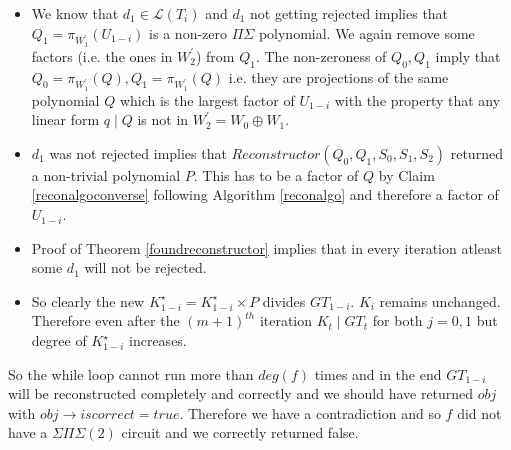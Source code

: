 \documentclass[letterpaper,USenglish,numberwithinsect]{lipics}
\newcommand{\ML}{\mathcal{L}}
\begin{document}
\begin{enumerate}
\begin{itemize}
  \item We know that $d_1\in \ML(T_i)$ and $d_1$ not getting rejected implies that $Q_1 =\pi_{W_1^\prime}(U_{1-i}) $ is a non-zero
  $\Pi\Sigma$ polynomial. We again remove some factors (i.e. the ones in $W_2^\prime$) from $Q_1$. The non-zeroness of
  $Q_0,Q_1$ imply that $Q_0= \pi_{W_1^\prime}(Q), Q_1= \pi_{W_1^\prime}(Q)$ i.e. they are projections of the same polynomial $Q$
  which is the largest factor of $U_{1-i}$ with the property that any linear form $q\mid Q$ is not in $W_2^\prime=W_0\oplus W_1$.
  \item $d_1$ was not rejected implies that $Reconstructor(Q_0,Q_1,S_0,S_1,S_2)$ returned a non-trivial polynomial $P$.
  This has to be a factor of $Q$ by Claim \ref{reconalgoconverse} following Algorithm \ref{reconalgo} and therefore a factor of $U_{1-i}$.
  \item Proof of Theorem \ref{foundreconstructor} implies that in every iteration atleast some $d_1$ will not be rejected.
  \item So clearly the new $K_{1-i}^\star = K_{1-i}^\star \times P$ divides $G T_{1-i}$. $K_i$ remains unchanged. Therefore
  even after the $(m+1)^{th}$ iteration $K_t\mid G T_t$ for both $j=0,1$ but degree of $K_{1-i}^\star$ increases.
 \end{itemize}
 So the while loop cannot run more than $deg(f)$ times and in the end $G T_{1-i}$ will be reconstructed completely
 and correctly and we should have returned $obj$ with $obj\rightarrow iscorrect=true$.
 Therefore we have a contradiction and so $f$ did not have a $\Sigma\Pi\Sigma(2)$ circuit and we correctly returned false.


\end{enumerate}
\end{document}
